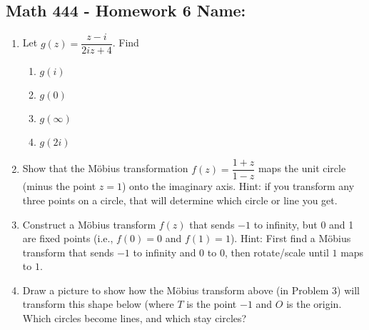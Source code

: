 \documentclass[11pt]{article}
\newcommand{\R}{\mathbb{R}}
\begin{document}
\pagestyle{empty}
\subsection*{Math 444 - Homework 6 \hfill Name: \underline{\hspace*{2in}}}
\begin{enumerate}
\item Let $g(z) = \dfrac{z - i}{2iz + 4}$. Find
\begin{enumerate}
\item $g(i)$ \\
\item $g(0)$ \\
\item $g(\infty)$ \\
\item $g(2i)$ \\
\end{enumerate}


\item Show that the M\"obius transformation $f(z) = \dfrac{1+z}{1-z}$ maps the unit circle (minus the point $z=1$) onto the imaginary axis. Hint: if you transform any three points on a circle, that will determine which circle or line you get.
\vfill



\item Construct a M\"obius transform $f(z)$ that sends $-1$ to infinity, but 0 and 1 are fixed points (i.e., $f(0) = 0$ and $f(1) = 1$).  Hint: First find a M\"obius transform that sends $-1$ to infinity and $0$ to $0$, then rotate/scale until $1$ maps to $1$.  
\vfill

\item Draw a picture to show how the M\"obius transform above (in Problem 3) will transform this shape below (where $T$ is the point $-1$ and $O$ is the origin.  Which circles become lines, and which stay circles? 
\begin{flushright}
\end{flushright}
\setcounter{enumCount}{\theenumi}
\end{enumerate}
\end{document}
